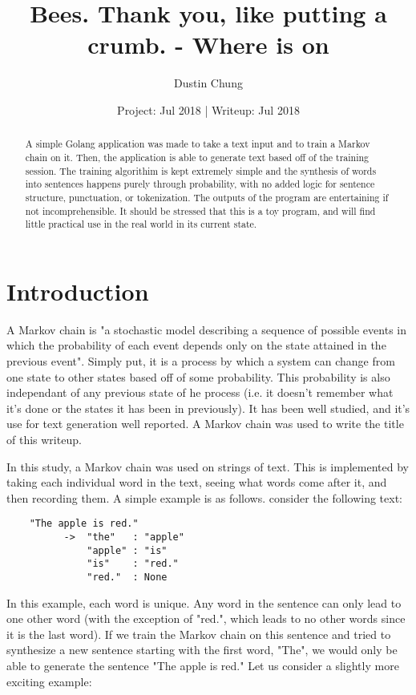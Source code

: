 \documentclass[11pt, a4paper]{article}
\begin{document}
  \title{Bees.  Thank you, like putting a crumb.    - Where is on}
  \author{Dustin Chung}
  \date{Project: Jul 2018 | Writeup: Jul 2018}
  \maketitle
  \begin{abstract}
    A simple Golang application was made to take a text input and to train a Markov chain on it. Then, the application is able to generate text based off of the training session. The training algorithim is kept extremely simple and the synthesis of words into sentences happens purely through probability, with no added logic for sentence structure, punctuation, or tokenization. The outputs of the program are entertaining if not incomprehensible. It should be stressed that this is a toy program, and will find little practical use in the real world in its current state.
  \end{abstract}

  \section{Introduction}
  A Markov chain is "a stochastic model describing a sequence of possible events in which the probability of each event depends only on the state attained in the previous event".\cite{definition} Simply put, it is a process by which a system can change from one state to other states based off of some probability. This probability is also independant of any previous state of he process (i.e. it doesn't remember what it's done or the states it has been in previously). It has been well studied, and it's use for text generation well reported. A Markov chain was used to write the title of this writeup. \newline

  In this study, a Markov chain was used on strings of text. This is implemented by taking each individual word in the text, seeing what words come after it, and then recording them. A simple example is as follows. consider the following text: \newline

  \begin{lstlisting}
    "The apple is red."
          ->  "the"   : "apple"
              "apple" : "is"
              "is"    : "red."
              "red."  : None
  \end{lstlisting}

  In this example, each word is unique. Any word in the sentence can only lead to one other word (with the exception of "red.", which leads to no other words since it is the last word). If we train the Markov chain on this sentence and tried to synthesize a new sentence starting with the first word, "The", we would only be able to generate the sentence "The apple is red." Let us consider a slightly more exciting example: \newline
\end{document}
